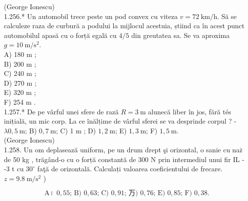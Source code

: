 \documentclass[10pt]{article}
\begin{document}
(George Ionescu)\\
1.256.* Un automobil trece peste un pod convex cu viteza $v=72 \mathrm{~km} / \mathrm{h}$. Să se calculeze raza de curbură a podului la mijlocul acestuia, știind ca în acest punct automobilul apasă cu o forță egală cu $4 / 5$ din greutatea sa. Se va aproxima $g=10 \mathrm{~m} / \mathrm{s}^{2}$.\\
A) 180 m ;\\
B) 200 m ;\\
C) 240 m ;\\
D) 270 m ;\\
E) 320 m ;\\
F) 254 m .\\
1.257.* De pe vârful unei sfere de rază $R=3 \mathrm{~m}$ alunecă liber în jos, fără tés inițială, un mic corp. La ce înălțime de vârful sferei se va desprinde corpul ? - $\lambda 0,5 \mathrm{~m}$; B) $0,7 \mathrm{~m}$; C) 1 m ; D) $1,2 \mathrm{~m}$; E) $1,3 \mathrm{~m}$; F) $1,5 \mathrm{~m}$.\\
(George Ionescu)\\
1.258. Un om deplasează uniform, pe un drum drept şi orizontal, o sanie cu naż de 50 kg , trăgând-o cu o forță constantă de 300 N prin intermediul unui fir IL - -3 t cu $30^{\circ}$ faţă de orizontală. Calculați valoarea coeficientului de frecare. $z=9.8 \mathrm{~m} / \mathrm{s}^{2}$ )

$$
\text { A। } 0,55 \text {; B) } 0,63 \text {; C) } 0,91 \text {; 万) } 0,76 \text {; E) } 0,85 \text {; F) } 0,38 \text {. }
$$
\end{document}
